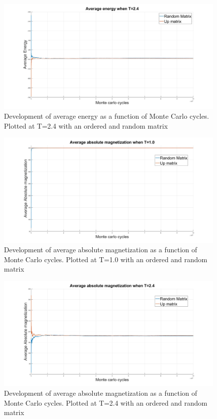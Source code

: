 \documentclass[10pt,a4paper]{article}
\begin{document}
\begin{figure} [H]
\centerline{
\includegraphics[scale=0.3]{avgEnergy24.jpg}
}
\caption{Development of average energy as a function of Monte Carlo cycles. Plotted at T=2.4 with an ordered and random matrix}
\label{fig:AverageEnergy24}
\end{figure}


\begin{figure} [H]
\centerline{
\includegraphics[scale=0.3]{avgMagn1.jpg}
}
\caption{Development of average absolute magnetization as a function of Monte Carlo cycles. Plotted at T=1.0 with an ordered and random matrix}
\label{fig:AverageMagn1}
\end{figure}


\begin{figure} [H]
\centerline{
\includegraphics[scale=0.3]{avgMagn24.jpg}
}
\caption{Development of average absolute magnetization as a function of Monte Carlo cycles. Plotted at T=2.4 with an ordered and random matrix}
\end{figure}
\end{document}
